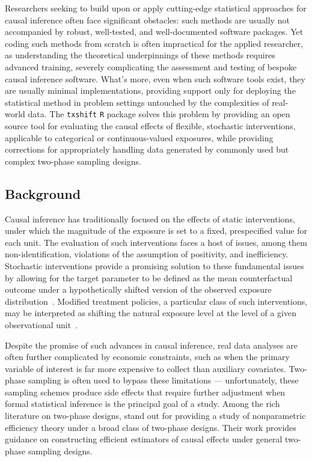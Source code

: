 Researchers seeking to build upon or apply cutting-edge statistical approaches
for causal inference often face significant obstacles: such methods are usually
not accompanied by robust, well-tested, and well-documented software packages.
Yet coding such methods from scratch is often impractical for the applied
researcher, as understanding the theoretical underpinnings of these methods
requires advanced training, severely complicating the assessment and testing of
bespoke causal inference software. What's more, even when such software tools
exist, they are usually minimal implementations, providing support only for
deploying the statistical method in problem settings untouched by the
complexities of real-world data. The \texttt{txshift} \texttt{R} package solves
this problem by providing an open source tool for evaluating the causal effects
of flexible, stochastic interventions, applicable to categorical or
continuous-valued exposures, while providing corrections for appropriately
handling data generated by commonly used but complex two-phase sampling designs.

\subsection{Background}

Causal inference has traditionally focused on the effects of static
interventions, under which the magnitude of the exposure is set to a fixed,
prespecified value for each unit. The evaluation of such interventions faces
a host of issues, among them non-identification, violations of the assumption of
positivity, and inefficiency. Stochastic interventions provide a promising
solution to these fundamental issues by allowing for the target parameter to be
defined as the mean counterfactual outcome under a hypothetically shifted
version of the observed exposure distribution~\citep{diaz2012population}.
Modified treatment policies, a particular class of such interventions, may be
interpreted as shifting the natural exposure level at the level of a given
observational unit~\citep{haneuse2013estimation, diaz2018stochastic}.

Despite the promise of such advances in causal inference, real data analyses are
often further complicated by economic constraints, such as when the primary
variable of interest is far more expensive to collect than auxiliary covariates.
Two-phase sampling is often used to bypass these limitations --- unfortunately,
these sampling schemes produce side effects that require further adjustment when
formal statistical inference is the principal goal of a study. Among the rich
literature on two-phase designs, \citet{rose2011targeted2sd} stand out for
providing a study of nonparametric efficiency theory under a broad class of
two-phase designs. Their work provides guidance on constructing efficient
estimators of causal effects under general two-phase sampling designs.

